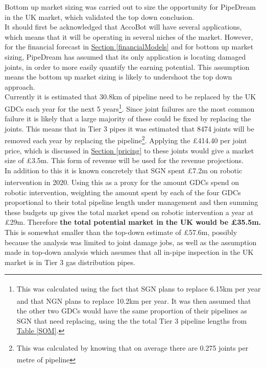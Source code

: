 \documentclass[11pt]{article}		%
\newcommand{\supercite}[1]{\textsuperscript{\cite{#1}}}		%
\newcommand{\tableref}[1]{\hyperref[#1]{Table \ref*{#1}}}     %
\newcommand{\sectref}[1]{\hyperref[#1]{Section \ref*{#1}}}     %
\begin{document}
        Bottom up market sizing was carried out to size the opportunity for PipeDream in the UK market, which validated the top down conclusion.
        \\
        \hspace*{2ex}It should first be acknowledged that AccoBot will have several applications, which means that it will be operating in several niches of the market. However, for the financial forecast in \sectref{financialModels} and for bottom up market sizing, PipeDream has assumed that its only application is locating damaged joints, in order to more easily quantify the earning potential. This assumption means the bottom up market sizing is likely to undershoot the top down approach.
        \\
        \hspace*{2ex}Currently it is estimated that 30.8km of pipeline need to be replaced by the UK GDCs each year for the next 5 years\footnote{This was calculated using the fact that SGN plans to replace 6.15km per year\supercite{SGN_Southern}\supercite{SGN_Scotland} and that NGN plans to replace 10.2km per year\supercite{NGN_decisions}. It was then assumed that the other two GDCs would have the same proportion of their pipelines as SGN that need replacing, using the the total Tier 3 pipeline lengths from \tableref{SOM}.}. Since joint failures are the most common failure it is likely that a large majority of these could be fixed by replacing the joints. This means that in Tier 3 pipes it was estimated that 8474 joints will be removed each year by replacing the pipeline\footnote{This was calculated by knowing that on average there are 0.275 joints per metre of pipeline\supercite{SGN_Southern}}. %
        Applying the £414.40 per joint price, which is discussed in \sectref{pricing}  to these joints would give a market size of £3.5m. This form of revenue will be used for the revenue projections.
        \\
        \hspace*{2ex}In addition to this it is known concretely that SGN spent £7.2m on robotic intervention in 2020\supercite{SGN_Southern}\supercite{SGN_Scotland}. Using this as a proxy for the amount GDCs spend on robotic intervention, weighting the amount spent by each of the four GDCs proportional to their total pipeline length under management and then summing these budgets up gives the total market spend on robotic intervention a year at £29m. Therefore \textbf{the total potential market in the UK would be £35.5m.} This is somewhat smaller than the top-down estimate of £57.6m, possibly because the analysis was limited to joint damage jobs, as well as the assumption made in top-down analysis which assumes that all in-pipe inspection in the UK market is in Tier 3 gas distribution pipes. 
    
\end{document}
